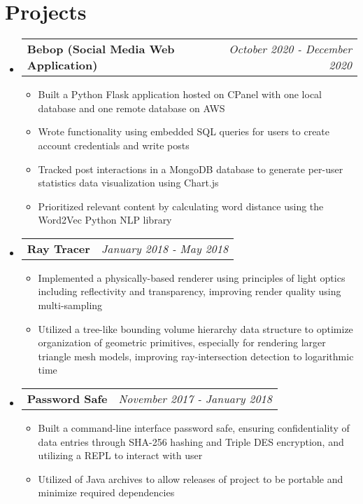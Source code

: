 \documentclass[letterpaper,11pt]{article}
\makeatletter
\newcommand{\resumeBullet}[1]
{\item[$\bullet$]\small
	{#1 \vspace{-1pt}
	}
}
\newcommand{\resumeSubheading}[2]
{\vspace{-1pt}\item[]\small
	\begin{tabular*}{0.97\textwidth}{l@{\extracolsep{\fill}}r}
		\textbf{#1} & \textit{\small #2} \\
	\end{tabular*}\vspace{-6pt}
}
\newcommand{\resumeSubHeadingListStart}{\begin{itemize}[leftmargin=*,itemsep=0.2pt]}
\newcommand{\resumeSubHeadingListEnd}{\end{itemize}\vspace{-4pt}}
\newcommand{\resumeItemListStart}{\begin{itemize}[itemsep=0.2pt]}
\newcommand{\resumeItemListEnd}{\end{itemize}\vspace{-4pt}}
\makeatother
\begin{document}
\section{Projects}
\resumeSubHeadingListStart
\resumeSubheading{Bebop (Social Media Web Application)}{October 2020 - December 2020}
\resumeItemListStart
\resumeBullet{Built a Python Flask application hosted on CPanel with one local database and one remote database on AWS}
\resumeBullet{Wrote functionality using embedded SQL queries for users to create account credentials and write posts}
\resumeBullet{Tracked post interactions in a MongoDB database to generate per-user statistics data visualization using Chart.js }
\resumeBullet{Prioritized relevant content by calculating word distance using the Word2Vec Python NLP library}
\resumeItemListEnd
\resumeSubheading{Ray Tracer}{January 2018 - May 2018}
\resumeItemListStart
\resumeBullet{Implemented a physically-based renderer using principles of light optics including reflectivity and transparency, improving render quality using multi-sampling}
\resumeBullet{Utilized a tree-like bounding volume hierarchy data structure to optimize organization of geometric primitives, especially for rendering larger triangle mesh models, improving ray-intersection detection to logarithmic time}
\resumeItemListEnd
\resumeSubheading{Password Safe}{November 2017 - January 2018}
\resumeItemListStart
\resumeBullet
{Built a command-line interface password safe, ensuring confidentiality of data entries through SHA-256 hashing and Triple DES encryption, and utilizing a REPL to interact with user}
\resumeBullet
{Utilized of Java archives to allow releases of project to be portable and minimize required dependencies}
\resumeItemListEnd

\resumeSubHeadingListEnd
\end{document}
